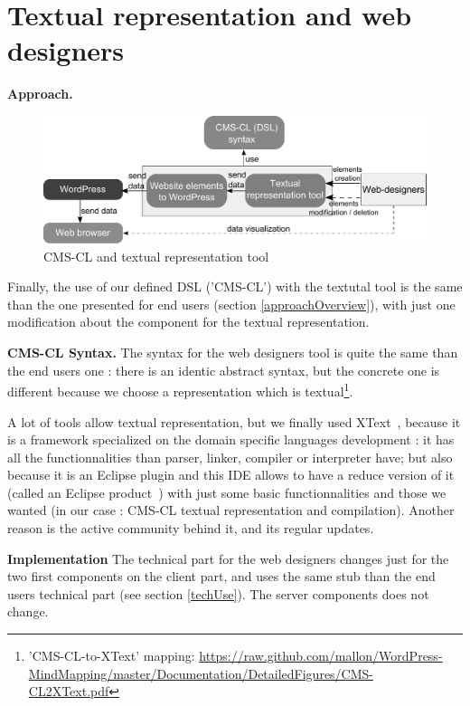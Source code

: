 \section{Textual representation and web designers}\label{webDesigners}
	\textbf{Approach.} 
	\begin{figure}[!h]
		\centering
		\includegraphics[width=\textwidth]{../resources/pdf/webDesignersSimplifiedPresentation.pdf}
		\caption{CMS-CL and textual representation tool}
		\label{CMS-CLIDEUse}
	\end{figure}
	Finally, the use of our defined DSL ('CMS-CL') with the textutal tool is the same than
	the one presented for end users (section \ref{approachOverview}), with just one modification about the component for the textual
	representation.		
	
	\vspace{0.15em}
	\noindent\textbf{CMS-CL Syntax.} The syntax for the web designers tool is quite the same than the end users one : there is an identic
	abstract syntax, but the concrete one is different because we choose a representation which is 
	textual\footnote{\scriptsize{'CMS-CL-to-XText' mapping:
	\url{https://raw.github.com/mallon/WordPress-MindMapping/master/Documentation/DetailedFigures/CMS-CL2XText.pdf}}}.
	
	A lot of tools allow textual representation, but we finally used XText~\cite{xtext}, because it is a framework specialized on
	the domain specific languages development : it has all the functionnalities than parser, linker, compiler or 
	interpreter have; but also because it is an Eclipse plugin and this IDE allows to have a reduce version of it 
	(called an Eclipse product~\cite{eclipseProduct}) with just some basic functionnalities and those we wanted (in our case : CMS-CL
	textual representation and compilation). Another reason is the active community behind it, and its	regular updates.	
	
	\vspace{0.15em}
	\noindent\textbf{Implementation} 	
	The technical part for the web designers changes just for the two first components on the client
	part, and uses the same stub than the end users technical part (see section \ref{techUse}). The server components does not change.
		
